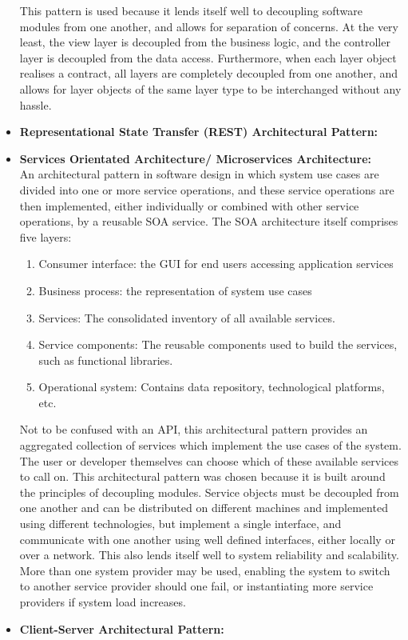 \documentclass[a4paper,10pt]{article}
\begin{document}
\begin{itemize}
		This pattern is used because it lends itself well to decoupling software modules from one another, and allows for separation of concerns. At the very least, the view layer is decoupled from the business logic, and the controller layer is decoupled from the data access. Furthermore, when each layer object realises a contract, all layers are completely decoupled from one another, and allows for layer objects of the same layer type to be interchanged without any hassle. 
		\item \textbf{Representational State Transfer (REST) Architectural Pattern:}\\
		\item \textbf{Services Orientated Architecture/ Microservices Architecture:}\\
		An architectural pattern in software design in which system use cases are divided into one or more service operations, and these service operations are then implemented, either individually or combined with other service operations, by a reusable SOA service. The SOA architecture itself comprises five layers:
		\begin{enumerate}
			\item Consumer interface: the GUI for end users accessing application services
			\item Business process: the representation of system use cases
			\item Services: The consolidated inventory of all available services.
			\item Service components: The reusable components used to build the services, such as functional libraries.
			\item Operational system: Contains data repository, technological platforms, etc.
		\end{enumerate}
		Not to be confused with an API, this architectural pattern provides an aggregated collection of services which implement the use cases of the system. The user or developer themselves can choose which of these available services to call on. This architectural pattern was chosen because it is built around the principles of decoupling modules. Service objects must be decoupled from one another and can be distributed on different machines and implemented using different technologies, but implement a single interface, and communicate with one another using well defined interfaces, either locally or over a network. This also lends itself well to system reliability and scalability. More than one system provider may be used, enabling the system to switch to another service provider should one fail, or instantiating more service providers if system load increases.
		\item \textbf{Client-Server Architectural Pattern:}\\
	\end{itemize}
\clearpage
\end{document}
